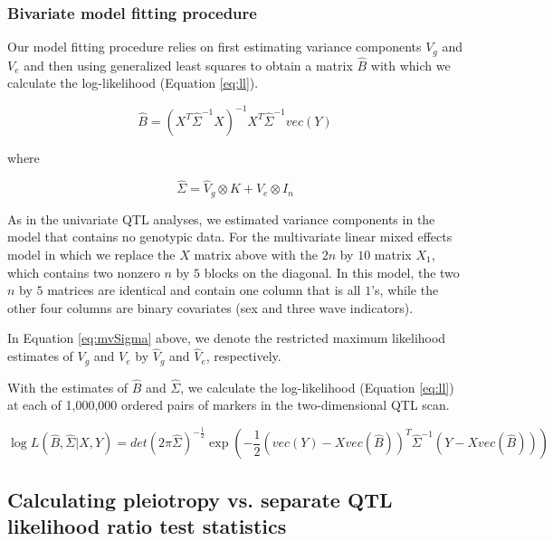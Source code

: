 \documentclass{article}
\begin{document}
\subsubsection{Bivariate model fitting procedure}

Our model fitting procedure relies on first estimating variance components $V_g$ and $V_e$ and then using generalized least squares to obtain a matrix $\hat B$ with which we calculate the log-likelihood (Equation \ref{eq:ll}).

\begin{equation}
\hat B = \left(X^T\hat \Sigma^{-1}X\right)^{-1}X^T\hat \Sigma^{-1}vec(Y)
\label{eq:Bhat}
\end{equation}

where 

\begin{equation}
\hat \Sigma = \hat V_g \otimes K + \hat V_e \otimes I_n
\label{eq:mvSigma}
\end{equation}

As in the univariate QTL analyses, we estimated variance components in the model that contains no genotypic data. For the multivariate linear mixed effects model in which we replace the $X$ matrix above with the $2n$ by $10$ matrix $X_1$, which contains two nonzero $n$ by $5$ blocks on the diagonal. In this model, the two $n$ by $5$ matrices are identical and contain one column that is all $1$'s, while the other four columns are binary covariates (sex and three wave indicators). 

In Equation \ref{eq:mvSigma} above, we denote the restricted maximum likelihood estimates of $V_g$ and $V_e$ by $\hat V_g$ and $\hat V_e$, respectively.

With the estimates of $\hat B$ and $\hat \Sigma$, we calculate the log-likelihood (Equation \ref{eq:ll}) at each of 1,000,000 ordered pairs of markers in the two-dimensional QTL scan.

\begin{equation}\label{eq:ll}
\log L(\hat B, \hat \Sigma | X, Y) = det(2\pi\hat \Sigma)^{- \frac{1}{2}} \exp{\left( - \frac{1}{2}(vec(Y) - Xvec(\hat B))^T\hat \Sigma ^ {-1}(Y - X vec(\hat B))\right)}
\end{equation}






\subsection{Calculating pleiotropy vs. separate QTL likelihood ratio test statistics}
\end{document}
